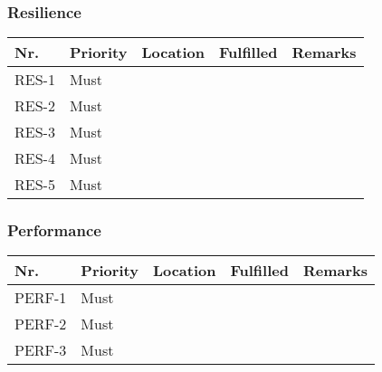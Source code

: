 \subsubsection{Resilience}
\begin{table}[H]
	\begin{tabular}{lllll}
						    
		Nr.   & Priority & Location & Fulfilled & Remarks \\ \hline
		RES-1 & Must     & ~        & ~         & ~       \\ 
		RES-2 & Must     & ~        & ~         & ~       \\ 
		RES-3 & Must     & ~        & ~         & ~       \\ 
		RES-4 & Must     & ~        & ~         & ~       \\ 
		RES-5 & Must     & ~        & ~         & ~       \\
						
	\end{tabular}
\end{table}

\subsubsection{Performance}
\begin{table}[H]
	\begin{tabular}{lllll}
						    
		Nr.    & Priority & Location & Fulfilled & Remarks \\ \hline
		PERF-1 & Must     & ~        & ~         & ~       \\ 
		PERF-2 & Must     & ~        & ~         & ~       \\ 
		PERF-3 & Must     & ~        & ~         & ~       \\
						
	\end{tabular}
\end{table}

